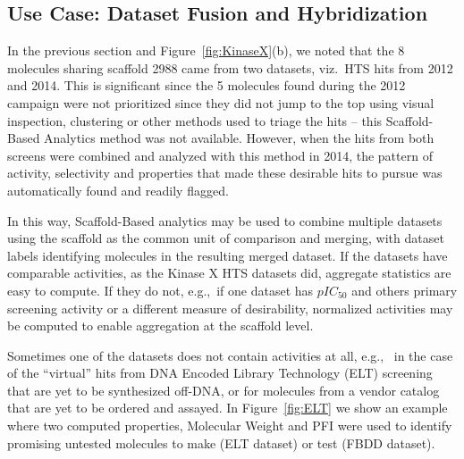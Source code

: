 \documentclass[journal=jacsat,biochem,manuscript=article]{achemso}
\newcommand*\fref[1]{Figure~\ref{fig:#1}}
\newcommand*\eg{e.g.,~}
\newcommand*\viz{viz.~}
\begin{document}
\subsection{Use Case: Dataset Fusion and Hybridization}
In the previous section and \fref{KinaseX}(b), we noted that the 8 molecules sharing scaffold 2988 came from two datasets, \viz HTS hits from 2012 and 2014. This is significant since the 5 molecules found during the 2012 campaign were not prioritized since they did not jump to the top using visual inspection, clustering or other methods used to triage the hits -- this Scaffold-Based Analytics method was not available. However, when the hits from both screens were combined and analyzed with this method in 2014, the pattern of activity, selectivity and properties that made these desirable hits to pursue was automatically found and readily flagged.

In this way, Scaffold-Based analytics may be used to combine multiple datasets using the scaffold as the common unit of comparison and merging, with dataset labels identifying molecules in the resulting merged dataset. If the datasets have comparable activities, as the Kinase X HTS datasets did, aggregate statistics are easy to compute. If they do not, \eg if one dataset has $pIC_{50}$ and others primary screening activity or a different measure of desirability, normalized activities may be computed to enable aggregation at the scaffold level.

Sometimes one of the datasets does not contain activities at all, \eg
in the case of the ``virtual'' hits from DNA Encoded Library Technology\cite{ELT}
(ELT) screening that are yet to be synthesized off-DNA, or for molecules from a vendor catalog that are yet to be ordered and assayed. In \fref{ELT} we show an example where two computed properties, Molecular Weight and PFI were used to identify promising untested molecules to make (ELT dataset) or test (FBDD dataset\cite{FBDD}).
 
\end{document}

